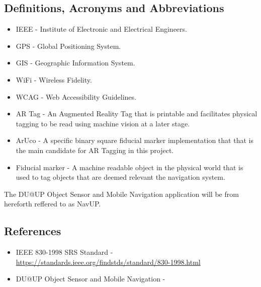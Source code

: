 \documentclass{article}
\begin{document}
		
	\subsection{Definitions, Acronyms and Abbreviations}
		\begin{itemize}
			\item IEEE - Institute of Electronic and Electrical Engineers.
			\item GPS - Global Positioning System.
			\item GIS - Geographic Information System.
			\item WiFi - Wireless Fidelity.
			\item WCAG - Web Accessibility Guidelines.
			\item AR Tag - An Augmented Reality Tag that is printable and facilitates physical tagging to be read using machine vision at a later stage.
			\item ArUco - A specific binary square fiducial marker implementation that that is the main candidate for AR Tagging in this project.
			\item Fiducial marker - A machine readable object in the physical world that is used to tag objects that are deemed relevant the navigation system.
		\end{itemize}
		
		The DU@UP Object Sensor and Mobile Navigation application will be from hereforth reffered to as NavUP.
		
	\subsection{References}
		\begin{itemize}
			\item IEEE 830-1998 SRS Standard - \url{https://standards.ieee.org/findstds/standard/830-1998.html}
			\item DU@UP Object Sensor and Mobile Navigation - \url{}
		\end{itemize}
	
\newpage
%
%	
\end{document}
